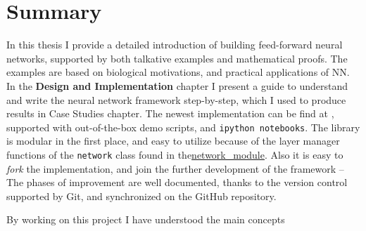 \chapter{Summary}

In this thesis I provide a detailed introduction of building feed-forward neural networks, supported by both talkative examples and mathematical proofs. 
The examples are based on biological motivations, and practical applications of NN. 
In the \textbf{Design and Implementation} chapter I present a guide to understand and write the neural network framework step-by-step, which I used to produce results in Case Studies chapter. 
The newest implementation can be find at \citep{DV}, supported with out-of-the-box demo scripts, and \texttt{ipython notebooks}.
The library is modular in the first place, and easy to utilize because of the layer manager functions of the \texttt{network} class found in the\url{network_module}. 
Also it is easy to \emph{fork} the implementation, and join the further development of the framework -- The phases of improvement are well documented, thanks to the version control supported by Git, and synchronized on the GitHub repository.

By working on this project I have understood the main concepts 